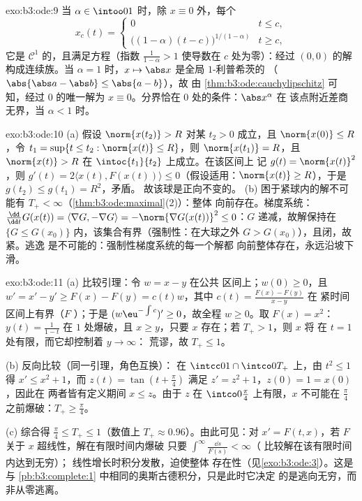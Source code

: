 \begin{solution}{exo:b3:ode:9}
当 $\alpha \in \intoo01$ 时，除 $x \equiv 0$ 外，每个
\[
x_c(t) = \begin{cases}0 & t \leq c,\\
\bigl((1-\alpha)(t - c)\bigr)^{1/(1-\alpha)} & t \geq c,
\end{cases}
\]
它是 $\mathcal C^1$ 的，且满足方程（指数
$\frac1{1-\alpha} > 1$ 使导数在 $c$ 处为零）：经过
$(0,0)$ 的解构成连续族。当 $\alpha = 1$ 时，$x
\mapsto \abs x$ 是全局 $1$-利普希茨的
（$\abs{\abs a - \abs b} \leq \abs{a - b}$），故
由 \cref{thm:b3:ode:cauchylipschitz} 可知，经过
$0$ 的唯一解为 $x \equiv 0$。分界恰在
$0$ 处的条件：$\abs x^\alpha$ 在
该点附近差商无界，当 $\alpha < 1$ 时。
\end{solution}

\begin{solution}{exo:b3:ode:10}
(a) 假设 $\norm{x(t_2)} > R$ 对某 $t_2 > 0$ 成立，且
$\norm{x(0)} \leq R$，令 $t_1 = \sup\{t \leq t_2 :
\norm{x(t)} \leq R\}$，则 $\norm{x(t_1)} = R$，且
$\norm{x(t)} > R$ 在 $\intoc{t_1}{t_2}$ 上成立。在该区间上
记 $g(t) = \norm{x(t)}^2$，则 $g'(t) = 2\langle x(t),
F(x(t))\rangle \leq 0$（假设适用：$\norm{x(t)}
\geq R$），于是 $g(t_2) \leq g(t_1) = R^2$，矛盾。
故该球是正向不变的。
(b) 困于紧球内的解不可能有
$T_+ < \infty$（\cref{thm:b3:ode:maximal}(2)）：整体
向前存在。梯度系统：$\frac{\dd}{\dd t}G(x(t)) =
\langle\nabla G, -\nabla G\rangle = -\norm{\nabla G(x(t))}^2
\leq 0$：$G$ 递减，故解保持在 $\{G \leq
G(x_0)\}$ 内，该集合有界（强制性：在大球之外
$G > G(x_0)$），且闭，故紧。逃逸
是不可能的：强制性梯度系统的每一个解都
向前整体存在，永远沿坡下滑。
\end{solution}

\begin{solution}{exo:b3:ode:11}
(a) 比较引理：令 $w = x - y$ 在公共
区间上；$w(0) \geq 0$，且 $w' = x' - y' \geq F(x) - F(y) =
c(t)w$，其中 $c(t) = \frac{F(x) - F(y)}{x - y}$ 在
紧时间区间上有界（$F$ ）；于是
$(w\eu^{-\int c})' \geq 0$，故全程 $w \geq 0$。取
$F(x) = x^2$：$y(t) = \frac1{1 - t}$ 在 $1$ 处爆破，且 $x
\geq y$，只要 $x$ 存在；若 $T_+ > 1$，则 $x$ 将
在 $t = 1$ 处有限，而它却控制着 $y \to \infty$：
荒谬，故 $T_+ \leq 1$。

(b) 反向比较（同一引理，角色互换）：
在 $\intcc01\cap\intco0{T_+}$ 上，由 $t^2 \leq 1$ 得 $x' \leq
x^2 + 1$，而 $z(t) = \tan(t + \frac\pi4)$ 满足 $z' =
z^2 + 1$，$z(0) = 1 = x(0)$，因此在
两者皆有定义期间 $x \leq z$。由于 $z$ 在
$\intco0{\frac\pi4}$ 上有限，$x$ 不可能在
$\frac\pi4$ 之前爆破：$T_+ \geq \frac\pi4$。

(c) 综合得 $\frac\pi4 \leq T_+ \leq 1$（数值上 $T_+
\approx 0.96$）。由此可见：对 $x' = F(t, x)$，若 $F$
关于 $x$ 超线性，解在有限时间内爆破
只要 $\int^\infty\frac{\dd s}{F(s)} < \infty$（
比较解在该有限时间内达到无穷）；
线性增长时积分发散，迫使整体
存在性（见\cref{exo:b3:ode:3}）。这是
与 \cref{pb:b3:complete:1} 中相同的奥斯古德积分，只是此时它决定
的是逃向无穷，而非从零逃离。
\end{solution}

